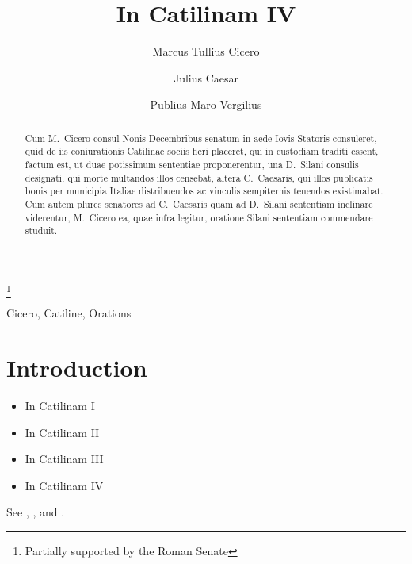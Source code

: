 \documentclass[letterpaper]{ifacmtg}
\begin{document}
\begin{frontmatter}
\title{In Catilinam IV}
\author[Paestum]{Marcus Tullius Cicero}
\author[Rome]{Julius Caesar}
\author[Baiae]{Publius Maro Vergilius}
\address[Paestum]{Buckingham Palace, Paestum}
\address[Rome]{Senate House, Rome}
\address[Baiae]{The White House, Baiae}
\thanks[Someone]{Partially supported by the Roman Senate}
\begin{abstract}
Cum M.~Cicero consul Nonis Decembribus senatum in aede
Iovis Statoris consuleret, quid de iis coniurationis Catilinae
sociis fieri placeret, qui in custodiam traditi essent, factum
est, ut duae potissimum sententiae proponerentur, una D.~Silani consulis
designati, qui morte multandos illos censebat,
altera C.~Caesaris, qui illos publicatis bonis per municipia
Italiae distribueudos ac vinculis sempiternis tenendos existimabat. Cum
autem plures senatores ad C.~Caesaris quam ad
D.~Silani sententiam inclinare viderentur, M.~Cicero ea, quae
infra legitur, oratione Silani sententiam commendare studuit.
\end{abstract}
\begin{keyword}
Cicero, Catiline, Orations
\end{keyword}
\end{frontmatter}

\section{Introduction}
\begin{itemize}
\item In Catilinam I
\item In Catilinam II
\item In Catilinam III
\item In Catilinam IV
\end{itemize}
See \cite{AbTaRu:54},  \cite{Abl:56}, \cite{Keo:58} and \cite{Pow:85}.
\end{document}

